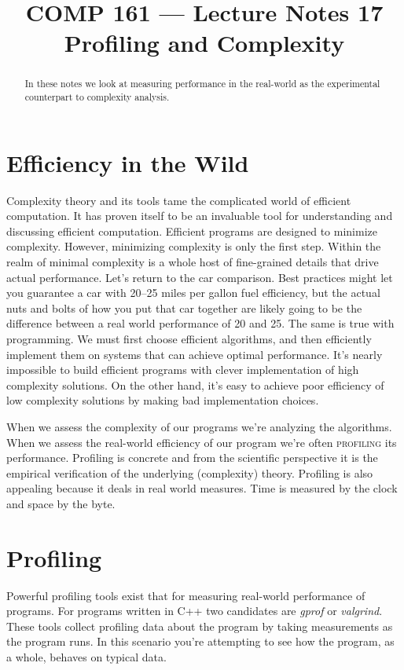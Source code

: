 \documentclass[]{tufte-handout}
\title{COMP 161 --- Lecture Notes 17 \\ Profiling and Complexity}
\date{}
\begin{document}
\maketitle

\begin{abstract}
In these notes we look at measuring performance in the real-world as the experimental counterpart to complexity analysis.
\end{abstract}


\section{Efficiency in the Wild}

Complexity theory and its tools tame the complicated world of efficient computation. It has proven itself to be an invaluable tool for understanding and discussing efficient computation. Efficient programs are designed to minimize complexity.  However, minimizing complexity is only the first step.  Within the realm of minimal complexity is a whole host of fine-grained details that drive actual performance. Let's return to the car comparison. Best practices might let you guarantee a car with 20--25 miles per gallon fuel efficiency, but the actual nuts and bolts of how you put that car together are likely going to be the difference between a real world performance of 20 and 25. The same is true with programming. We must first choose efficient algorithms, and then efficiently implement them on systems that can achieve optimal performance. It's nearly impossible to build efficient programs with clever implementation of high complexity solutions. On the other hand, it's easy to achieve poor efficiency of low complexity solutions by making bad implementation choices.

When we assess the complexity of our programs we're analyzing the algorithms. When we assess the real-world efficiency of our program we're often \textsc{profiling} its performance. Profiling is concrete and from the scientific perspective it is the empirical verification of the underlying (complexity) theory. Profiling is also appealing because it deals in real world measures. Time is measured by the clock and space by the byte.

\section{Profiling}

Powerful profiling tools exist that for measuring real-world performance of programs. For programs written in C++ two candidates are \textit{gprof} or \textit{valgrind}. These tools collect profiling data about the program by taking measurements as the program runs.  In this scenario you're attempting to see how the program, as a whole, behaves on typical data.
\end{document}
